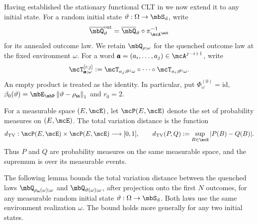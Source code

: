 \documentclass[a4paper]{article}
\numberwithin{equation}{section}   %
\theoremstyle{plain}   %
\theoremstyle{plain}   %
\theoremstyle{examplestyle}
\DeclareMathOperator{\states}{\mbS_d}   %
\DeclareMathOperator{\pr}{\mbP}           %
\newcommand{\s}{\rho_{\mathsf{ss}}}     %
\newcommand{\unorm}[1]{\left\lVert#1\right\rVert}
\begin{document}


Having established the stationary functional CLT in  we now extend it to any initial state.
For a random initial state $\vartheta:\Omega\to\states$, write
\[
\overline\mbQ^{\mathrm{out}}_\vartheta
=\overline\mbQ_\vartheta\circ\pi_{\mcA^\mbN}^{-1}
\]
for its annealed outcome law.
We retain $\mbQ_{\rho;\omega}$ for the quenched outcome law at the fixed environment $\omega$.
For a word $\pmb a=(a_i,\ldots,a_j)\in\mcA^{j-i+1}$, write
\[
    \mcT^{[i:j]}_{\pmb a;\omega}
    :=
    \mcT_{a_j;\theta^j\omega}\circ\cdots\circ
    \mcT_{a_i;\theta^i\omega}.
\]
An empty product is treated as the identity. 
In particular, put $\Phi^{(0)}_\omega=\mathrm{id}$, $\beta_0(\vartheta)=\mbE_{\pr}\unorm{\vartheta-\s}_1$ and $r_0=2$.

For a measurable space $(E,\mcE)$, let $\mcP(E,\mcE)$ denote the set of probability measures on $(E,\mcE)$.
The total variation distance is the function
\[
    d_{\mathrm{TV}}:
    \mcP(E,\mcE)\times\mcP(E,\mcE)\longrightarrow[0,1],
    \qquad
    d_{\mathrm{TV}}(P,Q)
    :=\sup_{B\in\mcE}|P(B)-Q(B)|.
\]
Thus $P$ and $Q$ are probability measures on the same measurable space, and the supremum is over its measurable events.

The following lemma bounds the total variation distance between the quenched laws $\mbQ_{\s(\omega);\omega}$ and $\mbQ_{\vartheta(\omega);\omega}$, after projection onto the first $N$ outcomes, for any measurable random initial state $\vartheta:\Omega\to\states$.
Both laws use the same environment realization $\omega$.
The bound holds more generally for any two initial states. 
\end{document}
